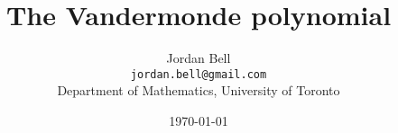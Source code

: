 \documentclass{article}
\theoremstyle{definition}
\begin{document}
\title{The Vandermonde polynomial}
\author{Jordan Bell\\ \texttt{jordan.bell@gmail.com}\\Department of Mathematics, University of Toronto}
\date{\today}
\maketitle

\nocite{*}



\end{document}
